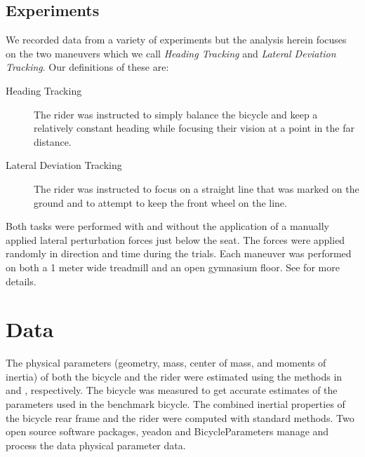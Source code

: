 \documentclass[a4paper]{article}
\begin{document}

\subsection{Experiments}
We recorded data from a variety of experiments \cite{Moore2012} but the
analysis herein focuses on the two maneuvers which we call \emph{Heading
Tracking} and \emph{Lateral Deviation Tracking}. Our definitions of these are:

\begin{description}
  \item[Heading Tracking]
    The rider was instructed to simply balance the bicycle and keep a
    relatively constant heading while focusing their vision at a point in the
    far distance.
  \item[Lateral Deviation Tracking]
    The rider was instructed to focus on a straight line that was marked on the
    ground and to attempt to keep the front wheel on the line.
\end{description}

Both tasks were performed with and without the application of a manually
applied lateral perturbation forces just below the seat. The forces were
applied randomly in direction and time during the trials. Each maneuver was
performed on both a 1 meter wide treadmill and an open gymnasium floor. See
\cite{Moore2012} for more details.

\section{Data}

The physical parameters (geometry, mass, center of mass, and moments of
inertia) of both the bicycle and the rider were estimated using the methods in
\cite{Moore2012} and \cite{Yeadon1990}, respectively. The bicycle was measured
to get accurate estimates of the parameters used in the benchmark bicycle. The
combined inertial properties of the bicycle rear frame and the rider were
computed with standard methods. Two open source software packages, yeadon
\cite{Dembia2011} and BicycleParameters \cite{Moore2011} manage and process the
data physical parameter data.

\end{document}
